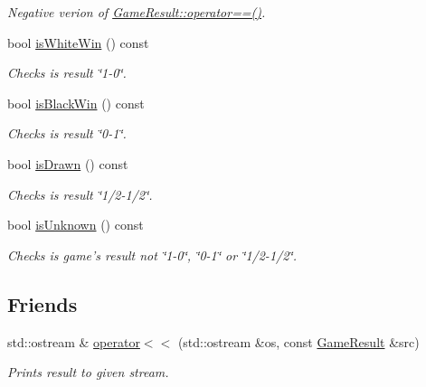 \begin{DoxyCompactItemize}
\begin{DoxyCompactList}\small\item\em Negative verion of \hyperlink{classpgn_1_1GameResult_a16b63d46d350921fd82b347fd672cf2d}{GameResult::operator==()}. \item\end{DoxyCompactList}\item 
bool \hyperlink{classpgn_1_1GameResult_a9f31f5bbb4edb633f5ffed005ac4da40}{isWhiteWin} () const 
\begin{DoxyCompactList}\small\item\em Checks is result \char`\"{}1-\/0\char`\"{}. \item\end{DoxyCompactList}\item 
bool \hyperlink{classpgn_1_1GameResult_a3fa942ec8c3161a6f1ec7dd2640dcd91}{isBlackWin} () const 
\begin{DoxyCompactList}\small\item\em Checks is result \char`\"{}0-\/1\char`\"{}. \item\end{DoxyCompactList}\item 
bool \hyperlink{classpgn_1_1GameResult_a61e5ec5c487399e405a6b1e0cfcf7fef}{isDrawn} () const 
\begin{DoxyCompactList}\small\item\em Checks is result \char`\"{}1/2-\/1/2\char`\"{}. \item\end{DoxyCompactList}\item 
bool \hyperlink{classpgn_1_1GameResult_a8677f97201226a09cca6c0bedf7f8777}{isUnknown} () const 
\begin{DoxyCompactList}\small\item\em Checks is game's result not \char`\"{}1-\/0\char`\"{}, \char`\"{}0-\/1\char`\"{} or \char`\"{}1/2-\/1/2\char`\"{}. \item\end{DoxyCompactList}\end{DoxyCompactItemize}
\subsection*{Friends}
\begin{DoxyCompactItemize}
\item 
std::ostream \& \hyperlink{classpgn_1_1GameResult_a27d55f60e270a7372206724456570c00}{operator$<$$<$} (std::ostream \&os, const \hyperlink{classpgn_1_1GameResult}{GameResult} \&src)
\begin{DoxyCompactList}\small\item\em Prints result to given stream. \item\end{DoxyCompactList}\end{DoxyCompactItemize}


